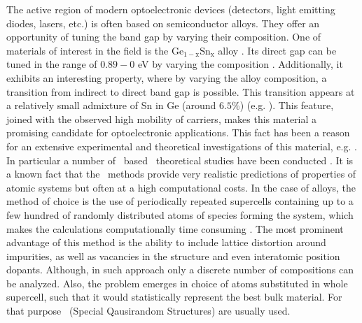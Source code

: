 The active region of modern optoelectronic devices (detectors, light emitting diodes, lasers, etc.) is often based on semiconductor alloys.
They offer an opportunity of tuning the band gap by varying their composition.
One of materials of interest in the field is the $\mathrm{Ge_{1-x}Sn_x}$ alloy \cite{homewood15, shigeaki15, margetis17, jeremie19, tran19}.
Its direct gap can be tuned in the range of $0.89-0$ eV by varying the composition \cite{growth,sigesn, Polak_2017, zhao20}.
Additionally, it exhibits an interesting property, where by varying the alloy composition, a transition from indirect to direct band gap is possible.
This transition appears at a relatively small admixture of Sn in Ge (around $6.5\%$) (e.g. \cite{Polak_2017}).
This feature, joined with the observed high mobility of carriers, makes this material a promising candidate for optoelectronic applications.
This fact has been a reason for an extensive experimental and theoretical investigations of this material, e.g. \cite{sigesn, Polak_2017, snge, zhao20,growth,PhysRevLett.79.1937,gesn-engineering,vegard,sisnge,gesn-0.14,ge_alloy_compare,electroreflectance, random_alloys,doi:10.1063/1.125558,SAHNOUN2005392,Moontragoon_2007,PhysRevB.78.161203,small_sn,ZHANG201212,article,doi:10.1063/1.4790362,HUANG201443,PhysRevB.89.165201,coherent_approx,C5CP02558C}.
In particular a number of \DFT\ based \abinitio\ theoretical studies have been conducted \cite{Polak_2017, zhao20, snge, random_alloys,doi:10.1063/1.125558,SAHNOUN2005392,Moontragoon_2007,PhysRevB.78.161203,small_sn,ZHANG201212,article,doi:10.1063/1.4790362,HUANG201443,PhysRevB.89.165201,coherent_approx,C5CP02558C}.
It is a known fact that the \abinitio\ methods provide very realistic predictions of properties of atomic systems but often at a high computational costs.
In the case of alloys, the method of choice is the use of periodically repeated supercells containing up to a few hundred of randomly distributed atoms of species forming the system, which makes the calculations computationally time consuming \cite{PhysRevB.89.165201,coherent_approx,C5CP02558C,Polak_2017}.
The most prominent advantage of this method is the ability to include lattice distortion around impurities, as well as vacancies in the structure and even interatomic position dopants.
Although, in such approach only a discrete number of compositions can be analyzed.
Also, the problem emerges in choice of atoms substituted in whole supercell, such that it would statistically represent the best bulk material.
For that purpose \SQS\ (Special Qausirandom Structures) \cite{sqs} are usually used.

